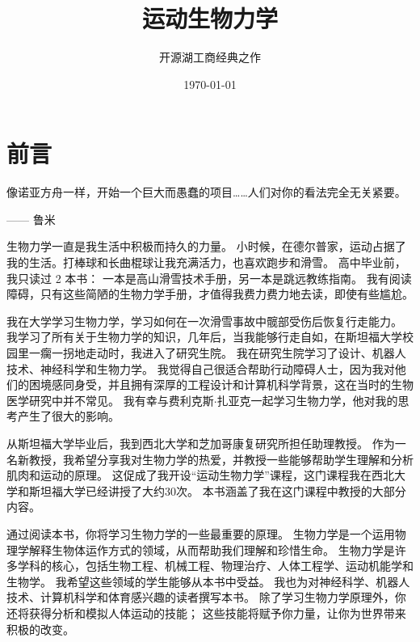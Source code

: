 \documentclass[cn,10pt,citestyle=gb7714-2015, bibstyle=gb7714-2015]{elegantbook}
\title{运动生物力学}
\subtitle{开源湖工商经典之作}
\institute{OpenHUTB}
\date{\today}
\begin{document}
\maketitle
\frontmatter

\chapter*{前言}




\vskip 1.5cm

像诺亚方舟一样，开始一个巨大而愚蠢的项目……人们对你的看法完全无关紧要。


\vskip 0.5cm



\begin{flushright}
—— 鲁米\\
\end{flushright}


生物力学一直是我生活中积极而持久的力量。
小时候，在德尔普家，运动占据了我的生活。打棒球和长曲棍球让我充满活力，也喜欢跑步和滑雪。
高中毕业前，我只读过 2 本书：
一本是高山滑雪技术手册，另一本是跳远教练指南。
我有阅读障碍，只有这些简陋的生物力学手册，才值得我费力费力地去读，即使有些尴尬。


我在大学学习生物力学，学习如何在一次滑雪事故中髋部受伤后恢复行走能力。
我学习了所有关于生物力学的知识，几年后，当我能够行走自如，在斯坦福大学校园里一瘸一拐地走动时，我进入了研究生院。
我在研究生院学习了设计、机器人技术、神经科学和生物力学。
我觉得自己很适合帮助行动障碍人士，因为我对他们的困境感同身受，并且拥有深厚的工程设计和计算机科学背景，这在当时的生物医学研究中并不常见。
我有幸与费利克斯$\cdot$扎亚克一起学习生物力学，他对我的思考产生了很大的影响。



从斯坦福大学毕业后，我到西北大学和芝加哥康复研究所担任助理教授。
作为一名新教授，我希望分享我对生物力学的热爱，并教授一些能够帮助学生理解和分析肌肉和运动的原理。
这促成了我开设“运动生物力学”课程，这门课程我在西北大学和斯坦福大学已经讲授了大约30次。
本书涵盖了我在这门课程中教授的大部分内容。


通过阅读本书，你将学习生物力学的一些最重要的原理。
生物力学是一个运用物理学解释生物体运作方式的领域，从而帮助我们理解和珍惜生命。
生物力学是许多学科的核心，包括生物工程、机械工程、物理治疗、人体工程学、运动机能学和生物学。
我希望这些领域的学生能够从本书中受益。
我也为对神经科学、机器人技术、计算机科学和体育感兴趣的读者撰写本书。
除了学习生物力学原理外，你还将获得分析和模拟人体运动的技能；
这些技能将赋予你力量，让你为世界带来积极的改变。
\end{document}
